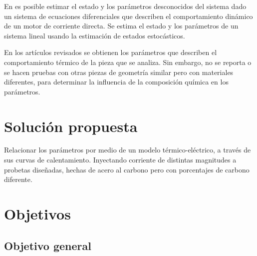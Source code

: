 En \cite{KalmanBucyPaz} es posible estimar el estado y los parámetros desconocidos del sistema dado un sistema de ecuaciones diferenciales que describen el comportamiento dinámico de un motor de corriente directa. 
Se estima el estado y los parámetros de un sistema lineal 
usando la estimación de estados estocásticos. 




En los artículos revisados se obtienen los parámetros que describen el comportamiento térmico de la pieza que se analiza. Sin embargo, no se reporta o se hacen pruebas con otras piezas de geometría similar pero con materiales diferentes, para determinar la influencia de la composición química en los parámetros.









\section{Solución propuesta} \label{sec:SolProp}

\noindent Relacionar los parámetros por medio de un modelo
térmico-eléctrico, a través de sus curvas de calentamiento. Inyectando corriente de distintas magnitudes a probetas diseñadas, hechas de acero al carbono pero con porcentajes de carbono diferente.


\section{Objetivos}

\subsection{Objetivo general}

